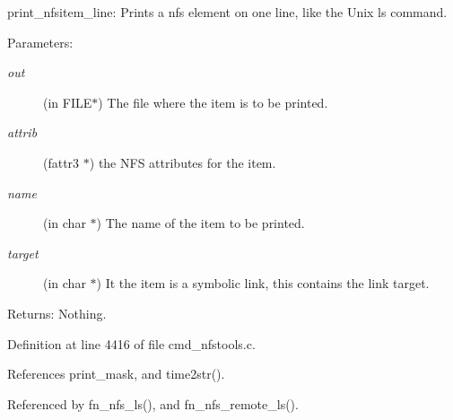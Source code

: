 print\_\-nfsitem\_\-line: Prints a nfs element on one line, like the Unix ls command.

\begin{Desc}
\item[Parameters:]
\begin{description}
\item[{\em out}](in FILE$\ast$) The file where the item is to be printed. \item[{\em attrib}](fattr3 $\ast$) the NFS attributes for the item. \item[{\em name}](in char $\ast$) The name of the item to be printed. \item[{\em target}](in char $\ast$) It the item is a symbolic link, this contains the link target. \end{description}
\end{Desc}
\begin{Desc}
\item[Returns:]Nothing. \end{Desc}


Definition at line 4416 of file cmd\_\-nfstools.c.

References print\_\-mask, and time2str().

Referenced by fn\_\-nfs\_\-ls(), and fn\_\-nfs\_\-remote\_\-ls().